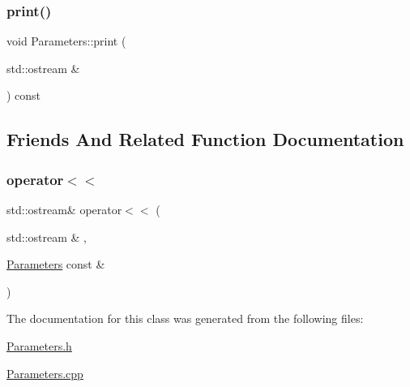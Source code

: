 \mbox{\label{classanen_par_1_1_parameters_adff840358049658c4bb93c2b17480e74}} 
\subsubsection{\texorpdfstring{print()}{print()}}
{\footnotesize\ttfamily void Parameters\+::print (\begin{DoxyParamCaption}\item[{std\+::ostream \&}]{ }\end{DoxyParamCaption}) const}



\subsection{Friends And Related Function Documentation}
\mbox{\label{classanen_par_1_1_parameters_a8ffabb0f94a5698a8a711fa5c449e622}} 
\subsubsection{\texorpdfstring{operator$<$$<$}{operator<<}}
{\footnotesize\ttfamily std\+::ostream\& operator$<$$<$ (\begin{DoxyParamCaption}\item[{std\+::ostream \&}]{,  }\item[{\mbox{\hyperlink{classanen_par_1_1_parameters}{Parameters}} const \&}]{ }\end{DoxyParamCaption})\hspace{0.3cm}{\ttfamily [friend]}}



The documentation for this class was generated from the following files\+:\begin{DoxyCompactItemize}
\item 
\mbox{\hyperlink{_parameters_8h}{Parameters.\+h}}\item 
\mbox{\hyperlink{_parameters_8cpp}{Parameters.\+cpp}}\end{DoxyCompactItemize}
